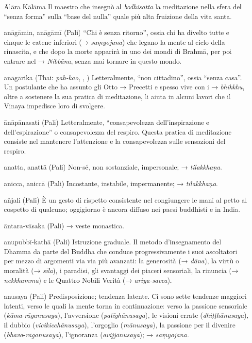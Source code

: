 \begin{glossarydescription}
\item[Ālāra Kālāma] Il maestro che insegnò al \emph{bodhisatta} la meditazione
nella sfera del ``senza forma'' sulla ``base del nulla'' quale più alta
fruizione della vita santa.

\item[anāgāmin, anāgāmī] (Pali) ``Chi è senza ritorno'', ossia chi ha
divelto tutte e cinque le catene inferiori (→ \emph{saṃyojana}) che
legano la mente al ciclo della rinascita, e che dopo la morte apparirà
in uno dei mondi di Brahmā, per poi entrare nel → \emph{Nibbāna}, senza
mai tornare in questo mondo.

\item[anāgārika] (Thai: \emph{pah-kao}, , )
Letteralmente, ``non cittadino'', ossia ``senza casa''. Un postulante
che ha assunto gli Otto → Precetti e spesso vive con i → \emph{bhikkhu},
oltre a sostenere la sua pratica di meditazione, li aiuta in alcuni
lavori che il Vinaya impedisce loro di svolgere.

\item[ānāpānasati] (Pali) Letteralmente, ``consapevolezza dell'inspirazione e
dell'espirazione'' o consapevolezza del respiro. Questa pratica di
meditazione consiste nel mantenere l'attenzione e la consapevolezza
sulle sensazioni del respiro.

\item[anatta, anattā] (Pali) Non-sé, non sostanziale, impersonale; →
\emph{tilakkhaṇa}.

\item[anicca, aniccā] (Pali) Incostante, instabile, impermanente; →
\emph{tilakkhaṇa}.

\item[añjali] (Pali) È un gesto di rispetto consistente nel congiungere le
mani al petto al cospetto di qualcuno; oggigiorno è ancora diffuso nei
paesi buddhisti e in India.

\item[āntara-vāsaka] (Pali) → veste monastica.

\item[anupubbī-kathā] (Pali) Istruzione graduale. Il metodo d'insegnamento del
Dhamma da parte del Buddha che conduce progressivamente i suoi
ascoltatori per mezzo di argomenti via via più avanzati: la generosità
(→ \emph{dāna}), la virtù o moralità (→ \emph{sīla}), i paradisi, gli
svantaggi dei piaceri sensoriali, la rinuncia (→ \emph{nekkhamma}) e le
Quattro Nobili Verità (→ \emph{ariya-sacca}).

\item[anusaya] (Pali) Predisposizione; tendenza latente. Ci sono sette
tendenze maggiori latenti, verso le quali la mente torna in
continuazione: verso la passione sensoriale
(\emph{kāma}-\emph{rāganusaya}), l'avversione (\emph{patīghānusaya}),
le visioni errate (\emph{dhiṭṭhānusaya}), il dubbio
(\emph{vicikicchānusaya}), l'orgoglio (\emph{mānusaya}), la passione
per il divenire (\emph{bhava}-\emph{rāganusaya}), l'ignoranza
(\emph{avijjānusaya}); → \emph{saṃyojana.}


\end{glossarydescription}
